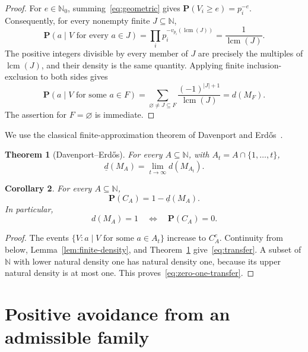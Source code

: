 \documentclass[11pt]{amsart}
\newtheorem{theorem}{Theorem}[section]
\newtheorem{corollary}[theorem]{Corollary}
\theoremstyle{definition}
\numberwithin{equation}{section}
\newcommand{\N}{\mathbb N}
\newcommand{\Nzero}{\mathbb N_0}
\newcommand{\Prob}{\mathbf P}
\DeclareMathOperator{\lcm}{lcm}
\begin{document}
\begin{proof}
For $e\in\Nzero$, summing~\eqref{eq:geometric} gives $\Prob(V_i\geq e)=p_i^{-e}$.
Consequently, for every nonempty finite $J\subseteq\N$,
\[
  \Prob(a\mid V\text{ for every }a\in J)
   =\prod_i p_i^{-v_{p_i}(\lcm(J))}
   =\frac1{\lcm(J)}.
\]
The positive integers divisible by every member of $J$ are precisely the multiples of $\lcm(J)$, and their density is the same quantity.
Applying finite inclusion-exclusion to both sides gives
\[
  \Prob(a\mid V\text{ for some }a\in F)
  =\sum_{\varnothing\neq J\subseteq F}
       \frac{(-1)^{|J|+1}}{\lcm(J)}
  =d(M_F).
\]
The assertion for $F=\varnothing$ is immediate.
\end{proof}

We use the classical finite-approximation theorem of Davenport and Erd\H{o}s~\cite{DavenportErdos1936}.

\begin{theorem}[Davenport--Erd\H{o}s]\label{thm:DE}
For every $A\subseteq\N$, with $A_t=A\cap\{1,\ldots,t\}$,
\begin{equation}\label{eq:DE}
  \underline d(M_A)=\lim_{t\to\infty}d(M_{A_t}).
\end{equation}
\end{theorem}

\begin{corollary}\label{cor:transfer}
For every $A\subseteq\N$,
\begin{equation}\label{eq:transfer}
  \Prob(C_A)=1-\underline d(M_A).
\end{equation}
In particular,
\begin{equation}\label{eq:zero-one-transfer}
  d(M_A)=1\quad\Longleftrightarrow\quad\Prob(C_A)=0.
\end{equation}
\end{corollary}

\begin{proof}
The events $\{V:a\mid V\text{ for some }a\in A_t\}$ increase to $C_A^c$.
Continuity from below, Lemma~\ref{lem:finite-density}, and Theorem~\ref{thm:DE} give~\eqref{eq:transfer}.
A subset of $\N$ with lower natural density one has natural density one, because its upper natural density is at most one.
This proves~\eqref{eq:zero-one-transfer}.
\end{proof}

\section{Positive avoidance from an admissible family}
\end{document}
